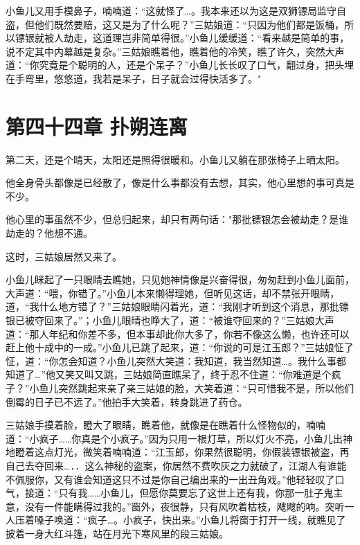 \documentclass[12pt,oneside]{book}
\begin{document}
小鱼儿又用手模鼻子，喃喃道：``这就怪了\ldots。我本来还以为这是双狮镖局监守自盗，但他们既然要赔，这又是为了什么呢？''三姑娘道：``只因为他们都是饭桶，所以镖银就被人劫走，这道理岂非简单得很。''小鱼儿缓缓道：``看来越是简单的事，说不定其中内幕越是复杂。''三姑娘瞧着他，瞧着他的冷笑，瞧了许久，突然大声道：``你究竟是个聪明的人，还是个呆子？''小鱼儿长长叹了口气，翻过身，把头埋在手弯里，悠悠道，我若是呆子，日子就会过得快活多了。"

\hypertarget{ux7b2cux56dbux5341ux56dbux7ae0-ux6251ux6714ux8fdeux79bb}{%
\chapter{第四十四章
扑朔连离}\label{ux7b2cux56dbux5341ux56dbux7ae0-ux6251ux6714ux8fdeux79bb}}

第二天，还是个晴天，太阳还是照得很暖和。小鱼儿又躺在那张椅子上晒太阳。

他全身骨头都像是已经散了，像是什么事都没有去想，其实，他心里想的事可真是不少。

他心里的事虽然不少，但总归起来，却只有两句话："那批镖银怎会被劫走？是谁劫走的？他想不通。

这时，三姑娘居然又来了。

小鱼儿眯起了一只眼睛去瞧她，只见她神情像是兴奋得很，匆匆赶到小鱼儿面前，大声道：``喂，你错了。''小鱼儿本来懒得理她，但听见这话，却不禁张开眼睛，道，``我什么地方错了？''三姑娘眼睛闪着光，道：``我刚才听到这个消息，那批镖银已被夺回来了。''；小鱼儿眼晴也睁大了，道：``被谁夺回来的？''三姑娘大声道：``那人年纪和你差不多，但本事却此你大多了，你若不像这么懒，也许还可以赶上他十成中的一成。''小鱼儿已跳了起来，道：``你说的可是江玉郎？''三姑娘怔了怔，道：``你怎会知道？小鱼儿突然大笑道：我知道，我当然知道\ldots。我什么事都知道了\ldots{}''他又笑又叫又跳，三姑娘简直瞧呆了，终于忍不住道：``你难道是个疯子？''小鱼儿突然跳起来亲了亲三姑娘的脸，大笑着道：``只可惜我不是，所以他们倒霉的日子已不远了。''他拍手大笑着，转身跳进了药仓。

三姑娘手摸着脸，瞪大了眼睛，瞧着他，就像是在瞧着什么怪物似的，喃喃道：``小疯子\ldots\ldots 你真是个小疯子。''因为只用一根灯草，所以灯火不亮，小鱼儿出神地瞪着这点灯光，微笑着喃喃道：``江玉郎，你果然很聪明，你假装镖银被盗，再自己去夺回来\ldots．．这么神秘的盗案，你居然不费吹灰之力就破了，江湖人有谁能不佩服你，又有谁会知道这只不过是你自己编出来的一出丑角戏。''他轻轻叹了口气，接道：``只有我\ldots\ldots 小鱼儿，但愿你莫要忘了这世上还有我，你那一肚子鬼主意，没有一件能瞒得过我的。''窗外，夜很静，只有风吹着枯枝，飕飕的响。突听一人压着嗓子唤道：``疯子\ldots。小疯子，快出来。''小鱼儿将窗于打开一线，就瞧见了披着一身大红斗篷，站在月光下寒风里的段三姑娘。
\end{document}
